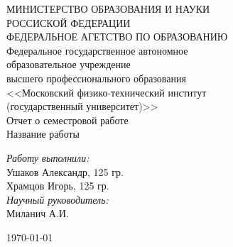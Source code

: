\begin{titlepage}


\begin{center}
МИНИСТЕРСТВО ОБРАЗОВАНИЯ И НАУКИ\\
РОССИСКОЙ ФЕДЕРАЦИИ \\
ФЕДЕРАЛЬНОЕ АГЕТСТВО ПО ОБРАЗОВАНИЮ\\
Федеральное государственное автономное\\
образовательное учреждение\\
высшего профессионального образования\\
<<Московский физико-технический институт\\
(государственный университет)>>\\

{ \huge {\rm Отчет о семестровой работе} \\
Название работы
\\[0.4cm] }
\end{center}
\vfill
\begin{flushright} \large
\emph{Работу выполнили:} \\
Ушаков Александр, 125 гр. \\
Храмцов Игорь, 125 гр. \\
\emph{Научный руководитель:} \\
Миланич А.И.
\end{flushright}




{\large \today}


\end{titlepage}